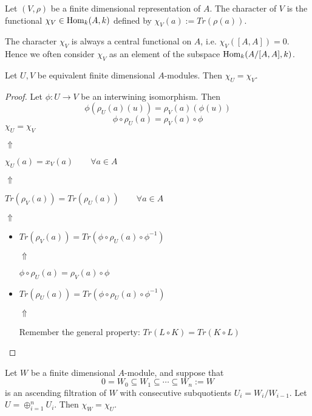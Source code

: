 \begin{defn}
Let \((V,\rho )\) be a finite dimensional representation of \(A\). The character of \(V\) is the functional \(\chi _V\in \operatorname{Hom}_{k}(A,k)\) defined by \(\chi _V(a):=Tr(\rho (a)).\)
\end{defn}

\begin{prop}
The character \(\chi _V\) is always a central functional on \(A\), i.e. \(\chi _V([A,A])=0.\) Hence we often consider \(\chi _V\) as an element of the subspace \(\operatorname{Hom}_{k}(A/[A,A],k)\).
\end{prop}

\begin{prop}
Let \(U,V\) be equivalent finite dimensional \(A\)-modules. Then \(\chi _U=\chi _V.\)
\end{prop}
\newpage
\begin{proof}
Let \(\phi :U\rightarrow V\) be an interwining isomorphism. Then
\[
\phi (\rho _U(a)(u))=\rho _V(a)(\phi (u)) 
\] \[
\phi \circ \rho _U(a)=\rho _V(a)\circ \phi 
\]
\(\chi _U=\chi _V\)

\(\Uparrow \)

\(\chi _U(a)=x_V(a) \qquad \forall a\in A\)

\(\Uparrow \)

\(Tr(\rho _V(a))=Tr(\rho _U(a)) \qquad \forall a\in A\)

\(\Uparrow \)

\begin{itemize}
  \item \(Tr(\rho _V(a))=Tr(\phi \circ \rho _U(a)\circ \phi ^{-1})\)

\(\Uparrow \)

\(\phi \circ \rho _U(a)=\rho _V(a)\circ \phi \)
  \item \(Tr(\rho _U(a))=Tr(\phi \circ \rho _U(a)\circ \phi ^{-1})\)

\(\Uparrow \)

Remember the general property: \(Tr(L\circ K)=Tr(K\circ L)\)
\end{itemize}

\end{proof}

\begin{prop}
Let \(W\) be a finite dimensional \(A\)-module, and suppose that
\[
0=W_{0}\subseteq W_{1}\subseteq \cdots \subseteq W_{n}:=W
\]
is an ascending filtration of \(W\) with consecutive subquotients \(U_{i}=W_{i}/W_{i-1}\). Let \(U=\oplus _{i=1}^n U_{i}\). Then \(\chi _W=\chi _U.\)
\end{prop}

